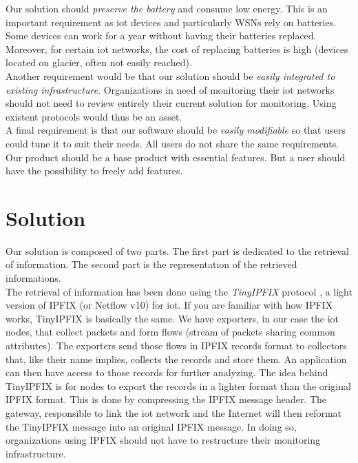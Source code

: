 Our solution should \textit{preserve the battery} and consume low energy. This is an important requirement as \acrshort{iot} devices and particularly WSNs rely on batteries. Some devices can work for a year without having their batteries replaced. Moreover, for certain \acrshort{iot} networks, the cost of replacing batteries is high (devices located on glacier, often not easily reached).\\

Another requirement would be that our solution should be \textit{easily integrated to existing infrastructure}. Organizations in need of monitoring their \acrshort{iot} networks should not need to review entirely their current solution for monitoring. Using existent protocols would thus be an asset. \\

A final requirement is that our software should be \textit{easily modifiable} so that users could tune it to suit their needs. All users do not share the same requirements. Our product should be a base product with essential features. But a user should have the possibility to freely add features.

\section*{Solution}

Our solution is composed of two parts. The first part is dedicated to the retrieval of information. The second part is the representation of the retrieved informations. \\

The retrieval of information has been done using the \textit{TinyIPFIX} protocol \cite{schmitt2016tinyipfix}, a light version of IPFIX (or Netflow v10) for \acrlong{iot}. If you are familiar with how IPFIX works, TinyIPFIX is basically the same. We have exporters, in our case the \acrshort{iot} nodes, that collect packets and form flows (stream of packets sharing common attributes). The exporters send those flows in IPFIX records format to collectors that, like their name implies, collects the records and store them. An application can then have access to those records for further analyzing. The idea behind TinyIPFIX is for nodes to export the records in a lighter format than the original IPFIX format. This is done by compressing the IPFIX message header. The gateway, responsible to link the \acrshort{iot} network and the Internet will then reformat the TinyIPFIX message into an original IPFIX message. In doing so, organizations using IPFIX should not have to restructure their monitoring infrastructure. \\

